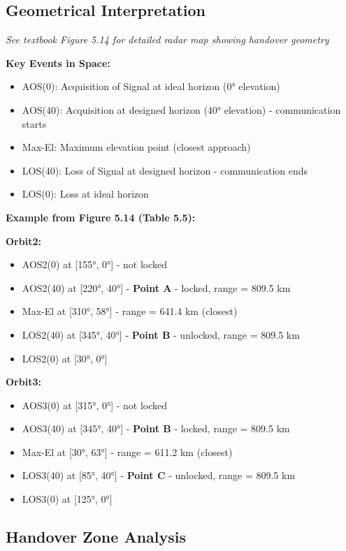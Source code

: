 \documentclass[11pt,letterpaper]{article}
\begin{document}
\subsection{Geometrical Interpretation}

\textit{See textbook Figure 5.14 for detailed radar map showing handover geometry}

\textbf{Key Events in Space:}
\begin{itemize}
    \item AOS(0): Acquisition of Signal at ideal horizon (0° elevation)
    \item AOS(40): Acquisition at designed horizon (40° elevation) - communication starts
    \item Max-El: Maximum elevation point (closest approach)
    \item LOS(40): Loss of Signal at designed horizon - communication ends
    \item LOS(0): Loss at ideal horizon
\end{itemize}

\textbf{Example from Figure 5.14 (Table 5.5):}

\textbf{Orbit2:}
\begin{itemize}
    \item AOS2(0) at [155°, 0°] - not locked
    \item AOS2(40) at [220°, 40°] - \textbf{Point A} - locked, range = 809.5 km
    \item Max-El at [310°, 58°] - range = 641.4 km (closest)
    \item LOS2(40) at [345°, 40°] - \textbf{Point B} - unlocked, range = 809.5 km
    \item LOS2(0) at [30°, 0°]
\end{itemize}

\textbf{Orbit3:}
\begin{itemize}
    \item AOS3(0) at [315°, 0°] - not locked
    \item AOS3(40) at [345°, 40°] - \textbf{Point B} - locked, range = 809.5 km
    \item Max-El at [30°, 63°] - range = 611.2 km (closest)
    \item LOS3(40) at [85°, 40°] - \textbf{Point C} - unlocked, range = 809.5 km
    \item LOS3(0) at [125°, 0°]
\end{itemize}

\subsection{Handover Zone Analysis}
\end{document}
